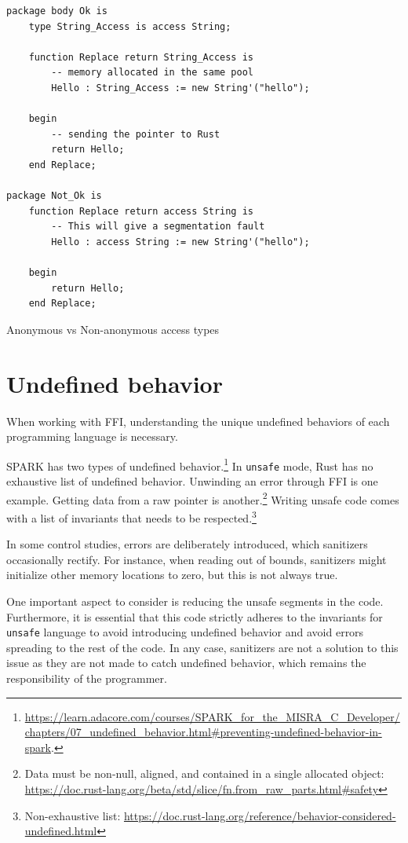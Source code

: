\documentclass[nomenclature, english, bibtex]{kththesis}
\begin{document}
{\begin{listing}[!ht]
\begin{verbatim}
package body Ok is
    type String_Access is access String;
  
    function Replace return String_Access is
        -- memory allocated in the same pool
        Hello : String_Access := new String'("hello");

    begin
        -- sending the pointer to Rust
        return Hello;
    end Replace;

package Not_Ok is
    function Replace return access String is
        -- This will give a segmentation fault
        Hello : access String := new String'("hello");

    begin
        return Hello;
    end Replace;
\end{verbatim}
\caption{Anonymous vs Non-anonymous access types}
\label{lst:samepool}
\end{listing}
\FloatBarrier

\section{Undefined behavior}
\label{sec:undefinied-behavior}
When working with \gls{FFI}, understanding the unique undefined behaviors of each programming language is necessary. 

SPARK has two types of undefined behavior.\footnote{\url{https://learn.adacore.com/courses/SPARK_for_the_MISRA_C_Developer/chapters/07_undefined_behavior.html\#preventing-undefined-behavior-in-spark}.}
In \texttt{unsafe} mode, Rust has no exhaustive list of undefined behavior. Unwinding an error through FFI is one example. Getting data from a raw pointer is another.\footnote{Data must be non-null, aligned, and contained in a single allocated object: \url{https://doc.rust-lang.org/beta/std/slice/fn.from_raw_parts.html\#safety}}
Writing unsafe code comes with a list of invariants that needs to be respected.\footnote{Non-exhaustive list: \url{https://doc.rust-lang.org/reference/behavior-considered-undefined.html}}

In some control studies, errors are deliberately introduced, which sanitizers occasionally rectify. For instance, when reading out of bounds, sanitizers might initialize other memory locations to zero, but this is not always true.

One important aspect to consider is reducing the unsafe segments in the code. Furthermore, it is essential that this code strictly adheres to the invariants for \texttt{unsafe} language to avoid introducing undefined behavior and avoid errors spreading to the rest of the code. In any case, sanitizers are not a solution to this issue as they are not made to catch undefined behavior, which remains the responsibility of the programmer.

}
\end{document}
